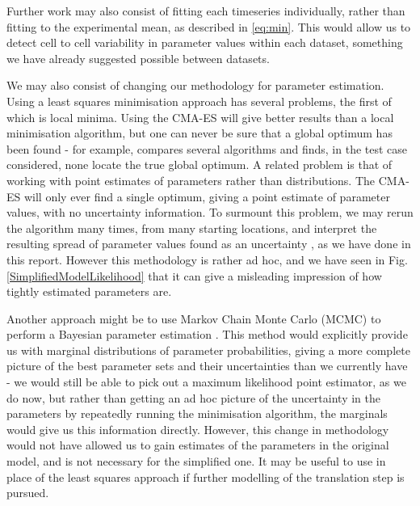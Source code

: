 \documentclass[10pt,journal]{./IEEE_latex_class/IEEEtran}
\begin{document}
Further work may also consist of fitting each timeseries individually, rather than fitting to the experimental mean, as described in \eqref{eq:min}. This would allow us to detect cell to cell variability in parameter values within each dataset, something we have already suggested possible between datasets.

We may also consist of changing our methodology for parameter estimation. Using a least squares minimisation approach has several problems, the first of which is local minima. Using the CMA-ES will give better results than a local minimisation algorithm, but one can never be sure that a global optimum has been found - for example, \cite{Algorithms2003} compares several algorithms and finds, in the test case considered, none locate the true global optimum.
A related problem is that of working with point estimates of parameters rather than distributions. The CMA-ES will only ever find a single optimum, giving a point estimate of parameter values, with no uncertainty information. To surmount this problem, we may rerun the algorithm many times, from many starting locations, and interpret the resulting spread of parameter values found as an uncertainty \cite{Hu2015}, as we have done in this report. However this methodology is rather ad hoc, and we have seen in Fig. \ref{SimplifiedModelLikelihood} that it can give a misleading impression of how tightly estimated parameters are.

Another approach might be to use Markov Chain Monte Carlo (MCMC) to perform a Bayesian parameter estimation \cite{Jitjareonchai2006,Andrieu2003}. This method would explicitly provide us with marginal distributions of parameter probabilities, giving a more complete picture of the best parameter sets and their uncertainties than we currently have - we would still be able to pick out a maximum likelihood point estimator, as we do now, but rather than getting an ad hoc picture of the uncertainty in the parameters by repeatedly running the minimisation algorithm, the marginals would give us this information directly. However, this change in methodology would not have allowed us to gain estimates of the parameters in the original model, and is not necessary for the simplified one. It may be useful to use in place of the least squares approach if further modelling of the translation step is pursued.

\begin{footnotesize}


\end{footnotesize}
\clearpage
\onecolumn
\end{document}
